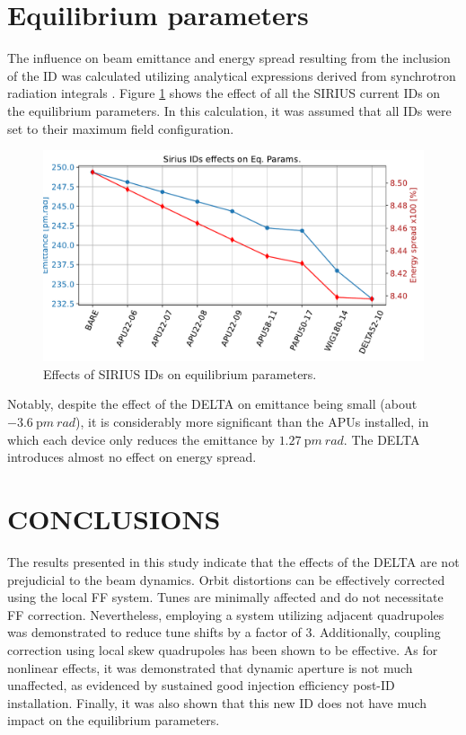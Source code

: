 \documentclass[a4paper,
               keeplastbox,   %
               ]{jacow}
\begin{document}
\section{Equilibrium parameters}
The influence on beam emittance and energy spread resulting from the inclusion of the ID was calculated utilizing analytical expressions derived from synchrotron radiation integrals \cite{Lee:1999}. Figure \ref{fig:eq_param} shows the effect of all the SIRIUS current IDs on the equilibrium parameters. In this calculation, it was assumed that all IDs were set to their maximum field configuration.

\begin{figure}[!h]
    \centering
   \includegraphics[width=\columnwidth]{eqparams.pdf}
   \caption{Effects of SIRIUS IDs on equilibrium parameters.}
   \label{fig:eq_param}
\end{figure}

Notably, despite the effect of the DELTA on emittance being small (about $\SI{-3.6}{\pico m~rad}$), it is considerably more significant than the APUs installed, in which each device only reduces the emittance by $\SI{1.27}{\pico m~rad}$. The DELTA introduces almost no effect on energy spread.

\section{CONCLUSIONS}

The results presented in this study indicate that the effects of the DELTA are not prejudicial to the beam dynamics. Orbit distortions can be effectively corrected using the local FF system. Tunes are minimally affected and do not necessitate FF correction. Nevertheless, employing a system utilizing adjacent quadrupoles was demonstrated to reduce tune shifts by a factor of 3. Additionally, coupling correction using local skew quadrupoles has been shown to be effective. As for nonlinear effects, it was demonstrated that dynamic aperture is not much unaffected, as evidenced by sustained good injection efficiency post-ID installation.
Finally, it was also shown that this new ID does not have much impact on the equilibrium parameters.
\end{document}
